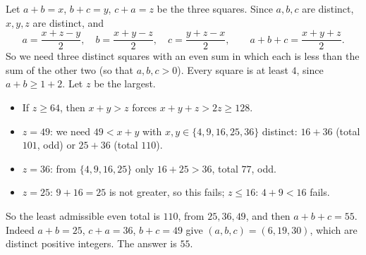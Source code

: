 Let $a+b=x$, $b+c=y$, $c+a=z$ be the three squares. Since $a,b,c$ are distinct, $x,y,z$ are distinct, and
\[
a=\dfrac{x+z-y}{2},\quad b=\dfrac{x+y-z}{2},\quad c=\dfrac{y+z-x}{2},\qquad a+b+c=\dfrac{x+y+z}{2}.
\]
So we need three distinct squares with an even sum in which each is less than the sum of the other two (so that $a,b,c>0$). Every square is at least $4$, since $a+b\ge1+2$. Let $z$ be the largest.
\begin{itemize}
\item If $z\ge64$, then $x+y>z$ forces $x+y+z>2z\ge128$.
\item $z=49$: we need $49<x+y$ with $x,y\in\{4,9,16,25,36\}$ distinct: $16+36$ (total $101$, odd) or $25+36$ (total $110$).
\item $z=36$: from $\{4,9,16,25\}$ only $16+25>36$, total $77$, odd.
\item $z=25$: $9+16=25$ is not greater, so this fails; $z\le16$: $4+9<16$ fails.
\end{itemize}
So the least admissible even total is $110$, from $25,36,49$, and then $a+b+c=55$. Indeed $a+b=25$, $c+a=36$, $b+c=49$ give $(a,b,c)=(6,19,30)$, which are distinct positive integers. The answer is $\boxed{55}$.
